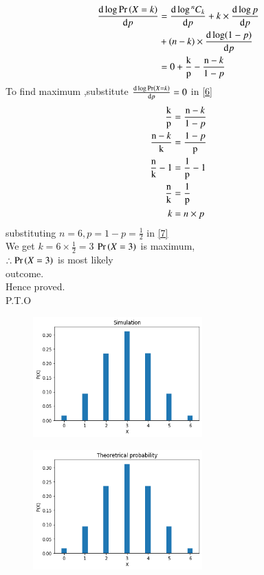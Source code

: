 \documentclass[journal,12pt,twocolumn]{IEEEtran}
\newcommand*{\Comb}[2]{{}^{#1}C_{#2}}%
\begin{document}
\begin{align}
\frac{\mathrm{d} \log \pr{X=k} }{\mathrm{d} p}&=\frac{\mathrm{d} \log  \Comb{n}{k} }{\mathrm{d}p}+k\times  \frac{\mathrm{d}\log p}{\mathrm{d} p} \\
     &+(n-k) \times \frac{\mathrm{d}\log (1-p)}{\mathrm{d} p} \notag \\
     &=0+\frac{\text k}{\text p}-\frac{\text n-k}{\text 1-p} \label{6}
\end{align}
To find maximum ,substitute $\frac{\mathrm{d} \log  \Pr\left(X=k\right) }{\mathrm{d} p}=0$ in \eqref{6}
\begin{align}
\frac{\text k}{\text p}&=\frac{\text n-k}{\text 1-p}  \\
\frac{\text n-k}{\text k}&=\frac{\text 1-p}{\text p}  \\
\frac{\text n}{\text k}-1&=\frac{\text 1}{\text p}-1  \\
\frac{\text n}{\text k}&=\frac{\text 1}{\text p}  \\
k&=n\times p \label{7}
\end{align}
substituting $n=6,p=1-p=\frac{1}{2}$ in \eqref{7}\\
We get $k=6\times \frac{1}{2}=3$
$\Pr\left(X=3\right)$ is maximum,\\
$\therefore\Pr\left(X=3\right)$ is most likely \\
outcome.\\
Hence proved.\\
P.T.O\\

\begin{figure}
\begin{center}
\includegraphics[width=0.58\textwidth]{assignment1.png}
\end{center}
\end{figure}
\begin{figure}
\begin{center}
\includegraphics[width=0.58\textwidth]{assignment-1.png}
\end{center}
\end{figure}
\end{document}
